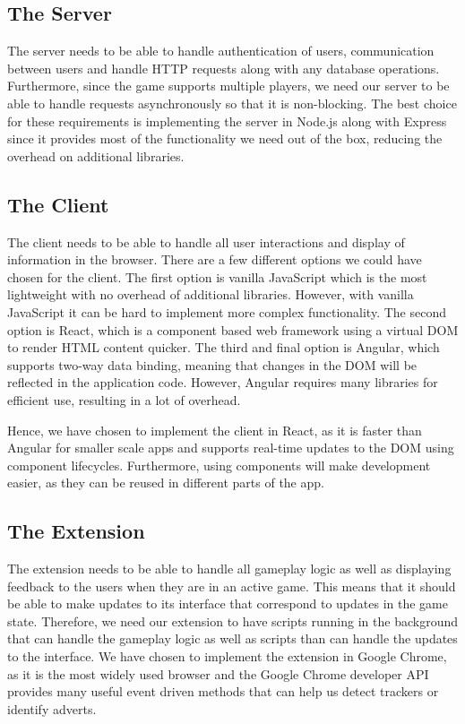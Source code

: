 \documentclass{l4proj}
\begin{document}
\subsection{The Server}
The server needs to be able to handle authentication of users, communication between users and handle HTTP requests along with any database operations. Furthermore, since the game supports multiple players, we need
our server to be able to handle requests asynchronously so that it is non-blocking. The best choice for these requirements is implementing the server in Node.js along with Express since it provides most of the functionality we need out of the box, reducing the overhead
on additional libraries.  

\subsection{The Client}
The client needs to be able to handle all user interactions and display of information in the browser. There are a few different options we could have chosen for the client. The first option is vanilla JavaScript which is the most lightweight
with no overhead of additional libraries. However, with vanilla JavaScript it can be hard to implement more complex functionality. The second option is React, which is a component based web framework using a virtual DOM to render HTML 
content quicker. The third and final option is Angular, which supports two-way data binding, meaning that changes in the DOM will be reflected in the application code. However, Angular requires many libraries for efficient use, resulting in a lot
of overhead.

Hence, we have chosen to implement the client in React, as it is faster than Angular for smaller scale apps and supports real-time updates to the DOM using component lifecycles. Furthermore, using components will make development easier, as they
can be reused in different parts of the app.

\subsection{The Extension}
The extension needs to be able to handle all gameplay logic as well as displaying feedback to the users when they are in an active game. This means that it should be able to make updates to its interface that correspond to updates in the game state.
Therefore, we need our extension to have scripts running in the background that can handle the gameplay logic as well as scripts than can handle the updates to the interface. We have chosen to implement the extension in Google Chrome, as it is the
most widely used browser and the Google Chrome developer API provides many useful event driven methods that can help us detect trackers or identify adverts.
\end{document}
